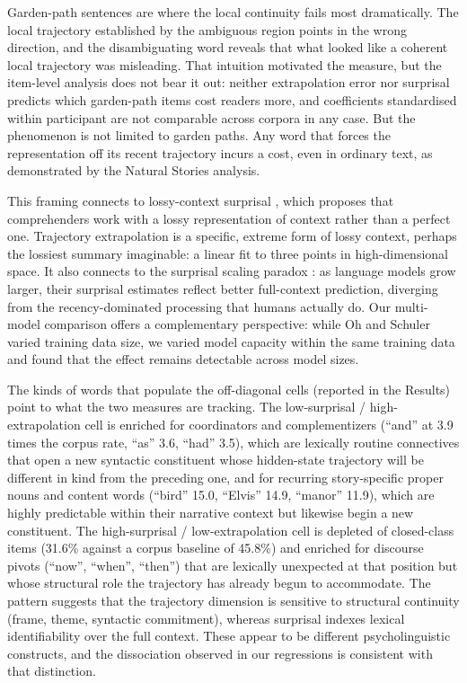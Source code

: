 \documentclass[12pt]{article}
\newcommand{\new}[1]{#1}   %
\begin{document}
Garden-path sentences are where the local continuity fails most dramatically. The local trajectory established by the ambiguous region points in the wrong direction, and the disambiguating word reveals that what looked like a coherent local trajectory was misleading. \new{That intuition motivated the measure, but the item-level analysis does not bear it out: neither extrapolation error nor surprisal predicts which garden-path items cost readers more, and coefficients standardised within participant are not comparable across corpora in any case.} But the phenomenon is not limited to garden paths. Any word that forces the representation off its recent trajectory incurs a cost, even in ordinary text, as demonstrated by the Natural Stories analysis.

This framing connects to lossy-context surprisal \citep{futrell2020}, which proposes that comprehenders work with a lossy representation of context rather than a perfect one. Trajectory extrapolation is a specific, extreme form of lossy context, perhaps the lossiest summary imaginable: a linear fit to three points in high-dimensional space. It also connects to the surprisal scaling paradox \citep{oh2023b}: as language models grow larger, their surprisal estimates reflect better full-context prediction, diverging from the recency-dominated processing that humans actually do. Our multi-model comparison offers a complementary perspective: while Oh and Schuler varied training data size, we varied model capacity within the same training data and found that the effect remains detectable across model sizes.

The kinds of words that populate the off-diagonal cells (reported in the Results) point to what the two measures are tracking. The low-surprisal / high-extrapolation cell is enriched for coordinators and complementizers (\new{``and'' at 3.9 times the corpus rate, ``as'' 3.6, ``had'' 3.5}), which are lexically routine connectives that open a new syntactic constituent whose hidden-state trajectory will be different in kind from the preceding one\new{, and for recurring story-specific proper nouns and content words (``bird'' 15.0, ``Elvis'' 14.9, ``manor'' 11.9), which are highly predictable within their narrative context but likewise begin a new constituent}. The high-surprisal / low-extrapolation cell is \new{depleted of closed-class items (31.6\% against a corpus baseline of 45.8\%) and enriched for} discourse pivots (\new{``now'', ``when'',} ``then''\new{)} that are lexically unexpected at that position but whose structural role the trajectory has already begun to accommodate. The pattern suggests that the trajectory dimension is sensitive to structural continuity (frame, theme, syntactic commitment), whereas surprisal indexes lexical identifiability over the full context. These appear to be different psycholinguistic constructs, and the dissociation observed in our regressions is consistent with that distinction.
\end{document}
